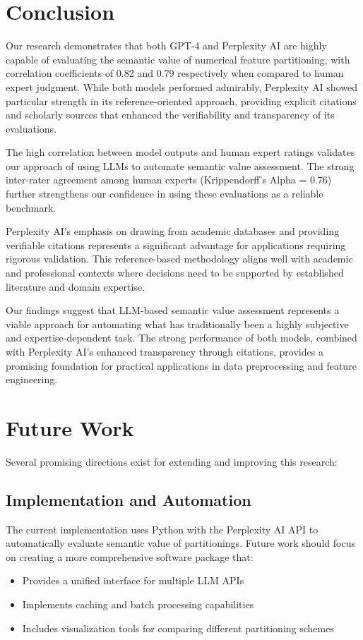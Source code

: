\documentclass{article}
\begin{document}
\section*{Conclusion}
Our research demonstrates that both GPT-4 and Perplexity AI are highly capable of evaluating the semantic value of numerical feature partitioning, with correlation coefficients of 0.82 and 0.79 respectively when compared to human expert judgment. While both models performed admirably, Perplexity AI showed particular strength in its reference-oriented approach, providing explicit citations and scholarly sources that enhanced the verifiability and transparency of its evaluations.

The high correlation between model outputs and human expert ratings validates our approach of using LLMs to automate semantic value assessment. The strong inter-rater agreement among human experts (Krippendorff's Alpha = 0.76) further strengthens our confidence in using these evaluations as a reliable benchmark.

Perplexity AI's emphasis on drawing from academic databases and providing verifiable citations represents a significant advantage for applications requiring rigorous validation. This reference-based methodology aligns well with academic and professional contexts where decisions need to be supported by established literature and domain expertise.

Our findings suggest that LLM-based semantic value assessment represents a viable approach for automating what has traditionally been a highly subjective and expertise-dependent task. The strong performance of both models, combined with Perplexity AI's enhanced transparency through citations, provides a promising foundation for practical applications in data preprocessing and feature engineering.


\section*{Future Work}
Several promising directions exist for extending and improving this research:

\subsection*{Implementation and Automation}
The current implementation uses Python with the Perplexity AI API to automatically evaluate semantic value of partitionings. Future work should focus on creating a more comprehensive software package that:
\begin{itemize}
    \item Provides a unified interface for multiple LLM APIs
    \item Implements caching and batch processing capabilities
    \item Includes visualization tools for comparing different partitioning schemes
\end{itemize}
\end{document}
